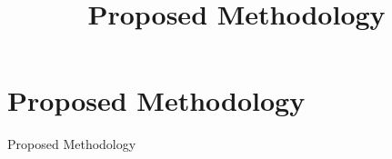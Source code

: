 \section{Proposed Methodology}
\title{Proposed Methodology}
\begin{frame}{Proposed Methodology}

	\begin{columns}
	    
  
    	
    
    \end{columns}
\end{frame}
